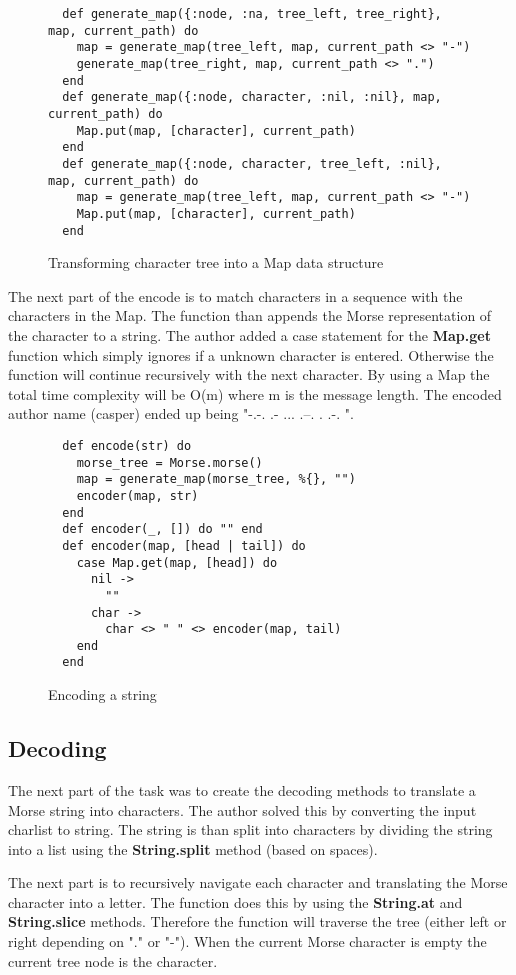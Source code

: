 \documentclass[a4paper,11pt]{article}
\begin{document}
\begin{figure}[H]
\begin{verbatim}
  def generate_map({:node, :na, tree_left, tree_right}, map, current_path) do
    map = generate_map(tree_left, map, current_path <> "-")
    generate_map(tree_right, map, current_path <> ".")
  end
  def generate_map({:node, character, :nil, :nil}, map, current_path) do
    Map.put(map, [character], current_path)
  end
  def generate_map({:node, character, tree_left, :nil}, map, current_path) do
    map = generate_map(tree_left, map, current_path <> "-")
    Map.put(map, [character], current_path)
  end
\end{verbatim}
\caption{Transforming character tree into a Map data structure}
\label{Figure:1}
\end{figure}

The next part of the encode is to match characters in a sequence with the characters in the Map. The function than appends the Morse representation of the character to a string. The author added a case statement for the \textbf{Map.get} function which simply ignores if a unknown character is entered. Otherwise the function will continue recursively with the next character. By using a Map the total time complexity will be O(m) where m is the message length. The encoded author name (casper) ended up being "-.-. .- ... .--. . .-. ".

\begin{figure}[H]
\begin{verbatim}
  def encode(str) do
    morse_tree = Morse.morse()
    map = generate_map(morse_tree, %{}, "")
    encoder(map, str)
  end
  def encoder(_, []) do "" end
  def encoder(map, [head | tail]) do
    case Map.get(map, [head]) do
      nil ->
        ""
      char ->
        char <> " " <> encoder(map, tail)
    end
  end
\end{verbatim}
\caption{Encoding a string}
\label{Figure:2}
\end{figure}

\subsection*{Decoding}
The next part of the task was to create the decoding methods to translate a Morse string into characters. The author solved this by converting the input charlist to string. The string is than split into characters by dividing the string into a list using the \textbf{String.split} method (based on spaces).

The next part is to recursively navigate each character and translating the Morse character into a letter. The function does this by using the \textbf{String.at} and \textbf{String.slice} methods. Therefore the function will traverse the tree (either left or right depending on "." or "-"). When the current Morse character is empty the current tree node is the character.
\end{document}

